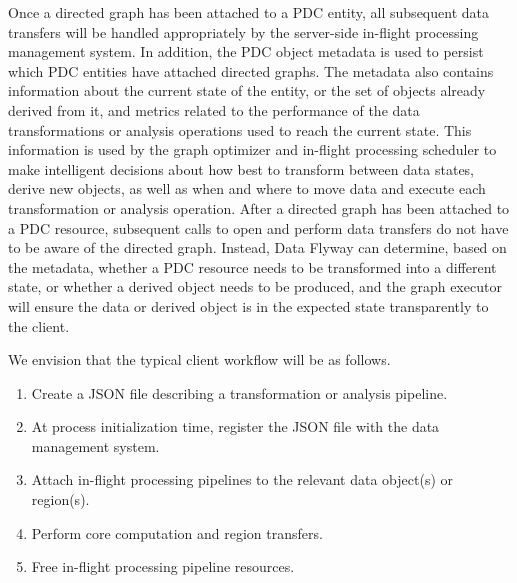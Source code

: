 
Once a directed graph has been attached to a PDC entity, all subsequent data transfers will be handled appropriately by the server-side in-flight processing management system. In addition, the PDC object metadata is used to persist which PDC entities have attached directed graphs. The metadata also contains information about the current state of the entity, or the set of objects already derived from it, and metrics related to the performance of the data transformations or analysis operations used to reach the current state. This information is used by the graph optimizer and in-flight processing scheduler to make intelligent decisions about how best to transform between data states, derive new objects, as well as when and where to move data and execute each transformation or analysis operation. After a directed graph has been attached to a PDC resource, subsequent calls to open and perform data transfers do not have to be aware of the directed graph. Instead, Data Flyway can determine, based on the metadata, whether a PDC resource needs to be transformed into a different state, or whether a derived object needs to be produced, and the graph executor will ensure the data or derived object is in the expected state transparently to the client.

We envision that the typical client workflow will be as follows.

\begin{enumerate}
    \item Create a JSON file describing a transformation or analysis pipeline.
    \item At process initialization time, register the JSON file with the data management system.
    \item Attach in-flight processing pipelines to the relevant data object(s) or region(s).
    \item Perform core computation and region transfers.
    \item Free in-flight processing pipeline resources.
\end{enumerate}

